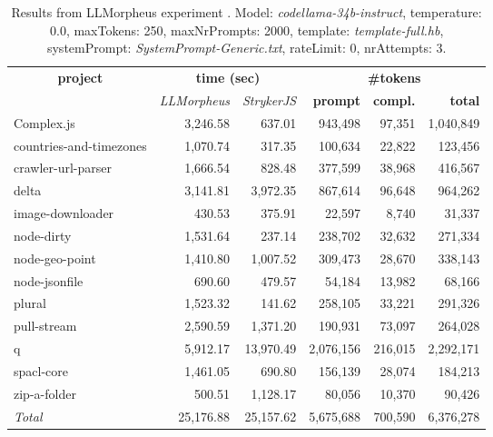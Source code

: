 
\begin{table*}[hbt!]
\centering
{\scriptsize
\begin{tabular}{l||r|r|r|r|r}
\multicolumn{1}{c|}{\bf project} & \multicolumn{2}{|c|}{\bf time (sec)} & \multicolumn{3}{|c|}{\bf \#tokens} \\
               & {\it LLMorpheus} & {\it StrykerJS} & {\bf prompt} & {\bf compl.} & {\bf total} \\
\hline
  Complex.js & 3,246.58 & 637.01 & 943,498 & 97,351 & 1,040,849 \\ 
countries-and-timezones & 1,070.74 & 317.35 & 100,634 & 22,822 & 123,456 \\ 
crawler-url-parser & 1,666.54 & 828.48 & 377,599 & 38,968 & 416,567 \\ 
delta & 3,141.81 & 3,972.35 & 867,614 & 96,648 & 964,262 \\ 
image-downloader & 430.53 & 375.91 & 22,597 & 8,740 & 31,337 \\ 
node-dirty & 1,531.64 & 237.14 & 238,702 & 32,632 & 271,334 \\ 
node-geo-point & 1,410.80 & 1,007.52 & 309,473 & 28,670 & 338,143 \\ 
node-jsonfile & 690.60 & 479.57 & 54,184 & 13,982 & 68,166 \\ 
plural & 1,523.32 & 141.62 & 258,105 & 33,221 & 291,326 \\ 
pull-stream & 2,590.59 & 1,371.20 & 190,931 & 73,097 & 264,028 \\ 
q & 5,912.17 & 13,970.49 & 2,076,156 & 216,015 & 2,292,171 \\ 
spacl-core & 1,461.05 & 690.80 & 156,139 & 28,074 & 184,213 \\ 
zip-a-folder & 500.51 & 1,128.17 & 80,056 & 10,370 & 90,426 \\ 
\hline
  \textit{Total} & 25,176.88 & 25,157.62 & 5,675,688 & 700,590 & 6,376,278 \\
  \end{tabular}
  }
  \\[2mm]
  \caption{Results from LLMorpheus experiment .
    Model: \textit{codellama-34b-instruct}, 
    temperature: 0.0, 
    maxTokens: 250, 
    maxNrPrompts: 2000, 
    template: \textit{template-full.hb}, 
    systemPrompt: \textit{SystemPrompt-Generic.txt}, 
    rateLimit: 0, 
    nrAttempts: 3.  
  }
  \label{table:Cost:run386:codellama-34b-instruct:template-full.hb:0.0}
\end{table*}
